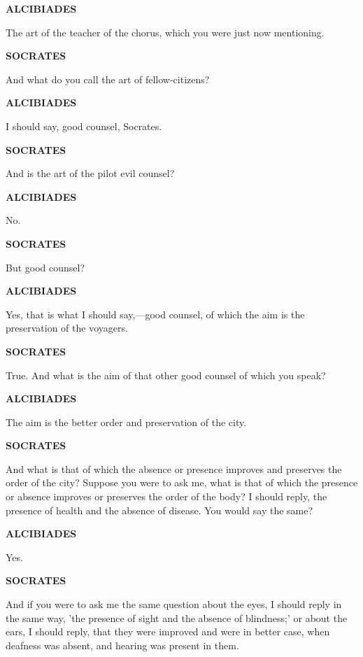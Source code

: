 \documentclass[11pt,letter]{article}
\begin{document}
\par \textbf{ALCIBIADES}
\par   The art of the teacher of the chorus, which you were just now mentioning.

\par \textbf{SOCRATES}
\par   And what do you call the art of fellow-citizens?

\par \textbf{ALCIBIADES}
\par   I should say, good counsel, Socrates.

\par \textbf{SOCRATES}
\par   And is the art of the pilot evil counsel?

\par \textbf{ALCIBIADES}
\par   No.

\par \textbf{SOCRATES}
\par   But good counsel?

\par \textbf{ALCIBIADES}
\par   Yes, that is what I should say,—good counsel, of which the aim is the preservation of the voyagers.

\par \textbf{SOCRATES}
\par   True. And what is the aim of that other good counsel of which you speak?

\par \textbf{ALCIBIADES}
\par   The aim is the better order and preservation of the city.

\par \textbf{SOCRATES}
\par   And what is that of which the absence or presence improves and preserves the order of the city? Suppose you were to ask me, what is that of which the presence or absence improves or preserves the order of the body? I should reply, the presence of health and the absence of disease. You would say the same?

\par \textbf{ALCIBIADES}
\par   Yes.

\par \textbf{SOCRATES}
\par   And if you were to ask me the same question about the eyes, I should reply in the same way, 'the presence of sight and the absence of blindness;' or about the ears, I should reply, that they were improved and were in better case, when deafness was absent, and hearing was present in them.
\end{document}
